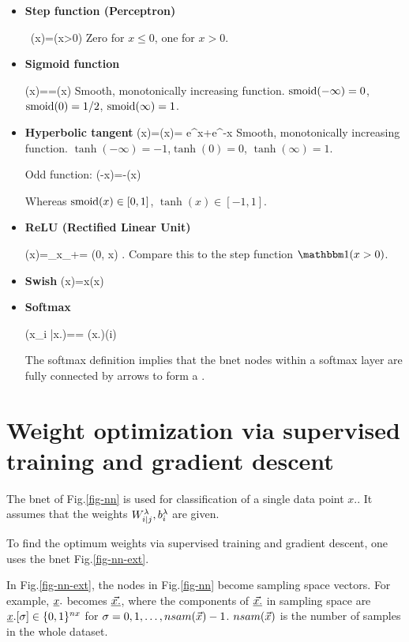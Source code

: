 \begin{itemize}
\item {\bf Step function (Perceptron)}

\beq\
\phi(x)=\indi(x>0)
\eeq
Zero for $x\leq 0$, one for $x>0$.

\item {\bf Sigmoid function}

\beq
\phi(x)==\smoid(x)
\eeq
Smooth, monotonically increasing
function.
${\rm smoid}(-\infty)=0$,${\rm smoid}(0)=1/2$,
${\rm smoid}(\infty)=1$.

\item {\bf Hyperbolic tangent}
\beq
\phi(x)=\tanh(x)=
{e^x+e^{-x}}
\eeq
Smooth,
 monotonically increasing function.
$\tanh(-\infty)=-1$,$\tanh(0)=0$,
$\tanh(\infty)=1$.

Odd function:
\beq
\tanh(-x)=-\tanh(x)
\eeq

Whereas ${\rm smoid}(x)\in [0,1]$,
$\tanh(x)\in[-1,1]$.


\item {\bf ReLU (Rectified Linear Unit)}

\beq
\phi(x)=_{x_+}= \max(0, x)
\;.
\eeq
Compare this to the step function
$\indi(x>0)$.

\item {\bf Swish}
\beq
\phi(x)=x\;\smoid(x)
\eeq
\item {\bf Softmax}

\beq
\phi(x_i
|x.)==
\softmax(x.)(i)
\eeq

The softmax definition implies
that the bnet nodes
 within a softmax layer
are fully connected by arrows
to form a .

\end{itemize}

\section{Weight
optimization via
supervised training and
gradient descent}

The bnet of Fig.\ref{fig-nn}
is used for classification
of a single data point $x.$.
It assumes that the
weights $W^\lambda_{i|j}, b_i^\lambda$
are given.

To find the optimum
weights via supervised
training and gradient descent,
one uses the bnet Fig.\ref{fig-nn-ext}.

In Fig.\ref{fig-nn-ext},
the nodes in
Fig.\ref{fig-nn} become
sampling space vectors.
For example, $\rvx.$ becomes
$\ranvec{x.}$, where the
components of
$\ranvec{x.}$ in sampling space are
$\rvx.[\sigma]\in \{0,1\}^{nx}$
for $\sigma=0, 1, \ldots, nsam({\vec{x}})-1$.
$nsam({\vec{x}})$
is the number of
samples in the whole dataset.


